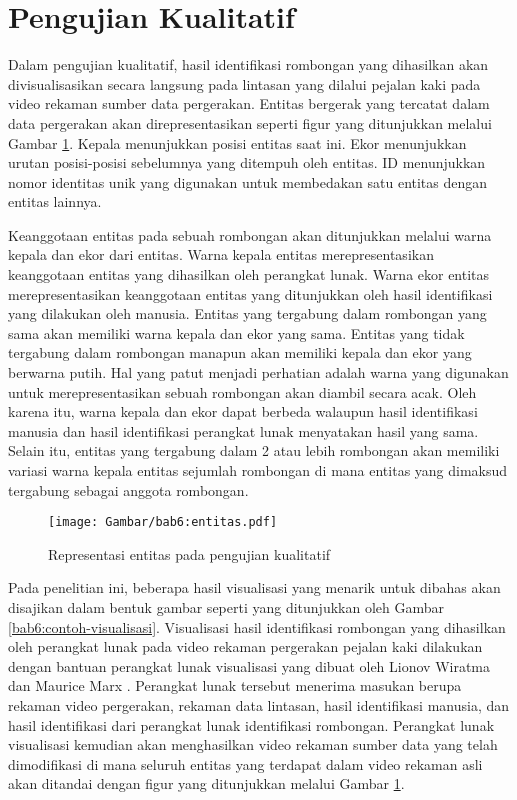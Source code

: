 \section{Pengujian Kualitatif}
\label{sec:qualitative}

Dalam pengujian kualitatif, hasil identifikasi rombongan yang dihasilkan akan divisualisasikan secara langsung pada lintasan yang dilalui pejalan kaki pada video rekaman sumber data pergerakan. Entitas bergerak yang tercatat dalam data pergerakan akan direpresentasikan seperti figur yang ditunjukkan melalui Gambar \ref{bab6:representasi-entitas}. Kepala menunjukkan posisi entitas saat ini. Ekor menunjukkan urutan posisi-posisi sebelumnya yang ditempuh oleh entitas. ID menunjukkan nomor identitas unik yang digunakan untuk membedakan satu entitas dengan entitas lainnya.

Keanggotaan entitas pada sebuah rombongan akan ditunjukkan melalui warna kepala dan ekor dari entitas. Warna kepala entitas merepresentasikan keanggotaan entitas yang dihasilkan oleh perangkat lunak. Warna ekor entitas merepresentasikan keanggotaan entitas yang ditunjukkan oleh hasil identifikasi yang dilakukan oleh manusia. Entitas yang tergabung dalam rombongan yang sama akan memiliki warna kepala dan ekor yang sama. Entitas yang tidak tergabung dalam rombongan manapun akan memiliki kepala dan ekor yang berwarna putih. Hal yang patut menjadi perhatian adalah warna yang digunakan untuk merepresentasikan sebuah rombongan akan diambil secara acak. Oleh karena itu, warna kepala dan ekor dapat berbeda walaupun hasil identifikasi manusia dan hasil identifikasi perangkat lunak menyatakan hasil yang sama. Selain itu, entitas yang tergabung dalam 2 atau lebih rombongan akan memiliki variasi warna kepala entitas sejumlah rombongan di mana entitas yang dimaksud tergabung sebagai anggota rombongan.

\begin{figure}[h]
    \centering
    \texttt{[image: Gambar/bab6:entitas.pdf]}
    \caption{Representasi entitas pada pengujian kualitatif}
    \label{bab6:representasi-entitas}
\end{figure}

Pada penelitian ini, beberapa hasil visualisasi yang menarik untuk dibahas akan disajikan dalam bentuk gambar seperti yang ditunjukkan oleh Gambar \ref{bab6:contoh-visualisasi}. Visualisasi hasil identifikasi rombongan yang dihasilkan oleh perangkat lunak pada video rekaman pergerakan pejalan kaki dilakukan dengan bantuan perangkat lunak visualisasi yang dibuat oleh Lionov Wiratma dan Maurice Marx \cite{wiratma:software}. Perangkat lunak tersebut menerima masukan berupa rekaman video pergerakan, rekaman data lintasan, hasil identifikasi manusia, dan hasil identifikasi dari perangkat lunak identifikasi rombongan. Perangkat lunak visualisasi kemudian akan menghasilkan video rekaman sumber data yang telah dimodifikasi di mana seluruh entitas yang terdapat dalam video rekaman asli akan ditandai dengan figur yang ditunjukkan melalui Gambar \ref{bab6:representasi-entitas}. 

